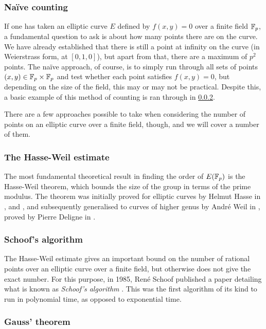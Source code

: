 \subsubsection{Naïve counting}
If one has taken an elliptic curve $E$ defined by $f(x,y)=0$ over a finite field $\mathbb{F}_{p}$, a fundamental question to ask is about how many points there are on the curve.
We have already established that there is still a point at infinity on the curve (in Weierstrass form, at $[0,1,0]$), but apart from that, there are a maximum of $p^2$ points. %
The naïve approach, of course, is to simply run through all sets of points $(x,y) \in \mathbb{F}_{p} \times \mathbb{F}_{p}$ and test whether each point satisfies $f(x,y)=0$, but depending on the size of the field, this may or may not be practical.
Despite this, a basic example of this method of counting is ran through in \cref{hasseweil}.

There are a few approaches possible to take when considering the number of points on an elliptic curve over a finite field, though, and we will cover a number of them.
\subsubsection{The Hasse-Weil estimate}
\label{hasseweil}
The most fundamental theoretical result in finding the order of $E(\mathbb{F}_{p})$ is the Hasse-Weil theorem, which bounds the size of the group in terms of the prime modulus.
The theorem was initially proved for elliptic curves by Helmut Hasse in \cite{hasse1936a}, \cite{hasse1936b} and \cite{hasse1936c}, and subsequently generalised to curves of higher genus by André Weil in \cite{weil1948}, proved by Pierre Deligne in \cite{deligne1974}.

\subsubsection{Schoof's algorithm}
The Hasse-Weil estimate gives an important bound on the number of rational points over an elliptic curve over a finite field, but otherwise does not give the exact number.
For this purpose, in 1985, René Schoof published a paper detailing what is known as \emph{Schoof's algorithm} \cite{schoof1995}.
This was the first algorithm of its kind to run in polynomial time, as opposed to exponential time.
\subsubsection{Gauss' theorem}

